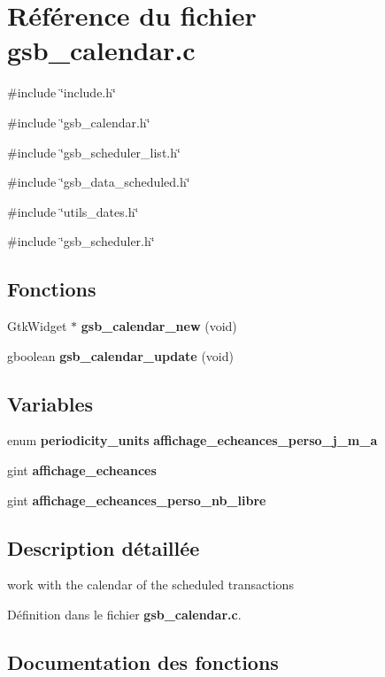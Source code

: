 \section{Référence du fichier gsb\_\-calendar.c}
\label{gsb__calendar_8c}
{\ttfamily \#include \char`\"{}include.h\char`\"{}}\par
{\ttfamily \#include \char`\"{}gsb\_\-calendar.h\char`\"{}}\par
{\ttfamily \#include \char`\"{}gsb\_\-scheduler\_\-list.h\char`\"{}}\par
{\ttfamily \#include \char`\"{}gsb\_\-data\_\-scheduled.h\char`\"{}}\par
{\ttfamily \#include \char`\"{}utils\_\-dates.h\char`\"{}}\par
{\ttfamily \#include \char`\"{}gsb\_\-scheduler.h\char`\"{}}\par
\subsection*{Fonctions}
\begin{DoxyCompactItemize}
\item 
GtkWidget $\ast$ {\bf gsb\_\-calendar\_\-new} (void)
\item 
gboolean {\bf gsb\_\-calendar\_\-update} (void)
\end{DoxyCompactItemize}
\subsection*{Variables}
\begin{DoxyCompactItemize}
\item 
enum {\bf periodicity\_\-units} {\bf affichage\_\-echeances\_\-perso\_\-j\_\-m\_\-a}
\item 
gint {\bf affichage\_\-echeances}
\item 
gint {\bf affichage\_\-echeances\_\-perso\_\-nb\_\-libre}
\end{DoxyCompactItemize}


\subsection{Description détaillée}
work with the calendar of the scheduled transactions 

Définition dans le fichier {\bf gsb\_\-calendar.c}.



\subsection{Documentation des fonctions}
